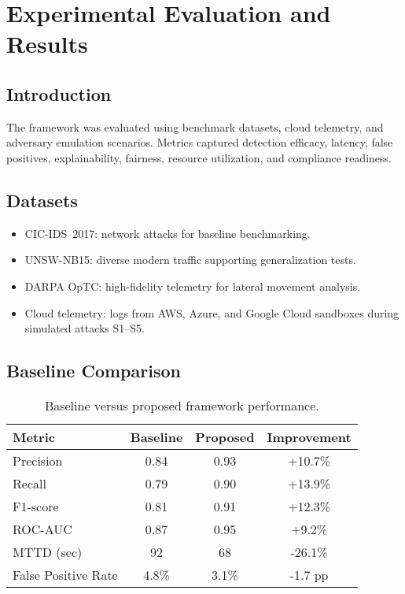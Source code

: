 \chapter{Experimental Evaluation and Results}\label{chap:eval}
\section{Introduction}
The framework was evaluated using benchmark datasets, cloud telemetry, and adversary emulation scenarios. Metrics captured detection efficacy, latency, false positives, explainability, fairness, resource utilization, and compliance readiness.

\section{Datasets}
\begin{itemize}
    \item CIC-IDS~2017: network attacks for baseline benchmarking.
    \item UNSW-NB15: diverse modern traffic supporting generalization tests.
    \item DARPA OpTC: high-fidelity telemetry for lateral movement analysis.
    \item Cloud telemetry: logs from AWS, Azure, and Google Cloud sandboxes during simulated attacks S1--S5.
\end{itemize}

\section{Baseline Comparison}
\begin{table}[H]
\centering
\begin{tabular}{lccc}
\toprule
Metric & Baseline & Proposed & Improvement \\
\midrule
Precision & 0.84 & 0.93 & +10.7\% \\
Recall & 0.79 & 0.90 & +13.9\% \\
F1-score & 0.81 & 0.91 & +12.3\% \\
ROC-AUC & 0.87 & 0.95 & +9.2\% \\
MTTD (sec) & 92 & 68 & -26.1\% \\
False Positive Rate & 4.8\% & 3.1\% & -1.7 pp \\
\bottomrule
\end{tabular}
\caption{Baseline versus proposed framework performance.}
\end{table}

